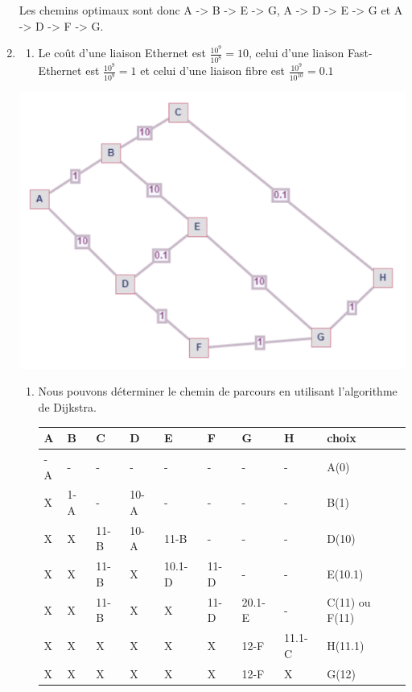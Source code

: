 \documentclass[
  letterpaper,
  DIV=11,
  numbers=noendperiod]{scrartcl}
\providecommand{\tightlist}{%
  \setlength{\itemsep}{0pt}\setlength{\parskip}{0pt}}\usepackage{longtable,booktabs,array}
\begin{document}
\begin{enumerate}
  Les chemins optimaux sont donc A -\textgreater{} B -\textgreater{} E
  -\textgreater{} G, A -\textgreater{} D -\textgreater{} E
  -\textgreater{} G et A -\textgreater{} D -\textgreater{} F
  -\textgreater{} G.
\item
  \begin{enumerate}
  \def\labelenumii{\alph{enumii}.}
  \tightlist
  \item
    Le coût d'une liaison Ethernet est \(\frac{10^9}{10^8}=10\), celui
    d'une liaison Fast-Ethernet est \(\frac{10^9}{10^9}=1\) et celui
    d'une liaison fibre est \(\frac{10^9}{10^{10}}=0.1\)
  \end{enumerate}

  \includegraphics{2023_CE_J1_fig1.png}

  \begin{enumerate}
  \def\labelenumii{\alph{enumii}.}
  \setcounter{enumii}{1}
  \item
    Nous pouvons déterminer le chemin de parcours en utilisant
    l'algorithme de Dijkstra.

    \begin{longtable}[]{@{}lllllllll@{}}
    \toprule\noalign{}
    A & B & C & D & E & F & G & H & choix \\
    \midrule\noalign{}
    \endhead
    \bottomrule\noalign{}
    \endlastfoot
    0-A & - & - & - & - & - & - & - & A(0) \\
    X & 1-A & - & 10-A & - & - & - & - & B(1) \\
    X & X & 11-B & 10-A & 11-B & - & - & - & D(10) \\
    X & X & 11-B & X & 10.1-D & 11-D & - & - & E(10.1) \\
    X & X & 11-B & X & X & 11-D & 20.1-E & - & C(11) ou F(11) \\
    X & X & X & X & X & X & 12-F & 11.1-C & H(11.1) \\
    X & X & X & X & X & X & 12-F & X & G(12) \\
    \end{longtable}


\end{enumerate}
\end{enumerate}
\end{document}
